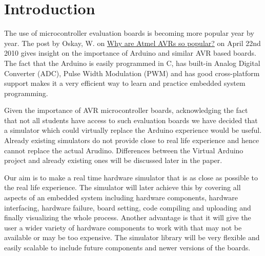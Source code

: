 
\chapter{Introduction}

The use of microcontroller evaluation boards is becoming more popular year by year. The post by Oskay, W. on \href{http://electronics.stackexchange.com/questions/2324/why-are-atmel-avrs-so-popular}{Why are Atmel AVRs so popular?} on April 22nd 2010 gives insight on the importance of Arduino and similar AVR based boards. The fact that the Arduino is easily programmed in C, has built-in Analog Digital Converter (ADC), Pulse Width Modulation (PWM) and has good cross-platform support makes it a very efficient way to learn and practice embedded system programming.

Given the importance of AVR microcontroller boards, acknowledging the fact that not all students have access to such evaluation boards we have decided that a simulator which could virtually replace the Arduino experience would be useful. Already existing simulators do not provide close to real life experience and hence cannot replace the actual Arudino. Differences between the Virtual Arduino project and already existing ones will be discussed later in the paper.

Our aim is to make a real time hardware simulator that is as close as possible to the real life experience. The simulator will later achieve this by covering all aspects of an embedded system including hardware components, hardware interfacing, hardware failure, board setting, code compiling and uploading and finally visualizing the whole process. Another advantage is that it will give the user a wider variety of hardware components to work with that may not be available or may be too expensive. The simulator library will be very flexible and easily scalable to include future components and newer versions of the boards.

\clearpage  %
